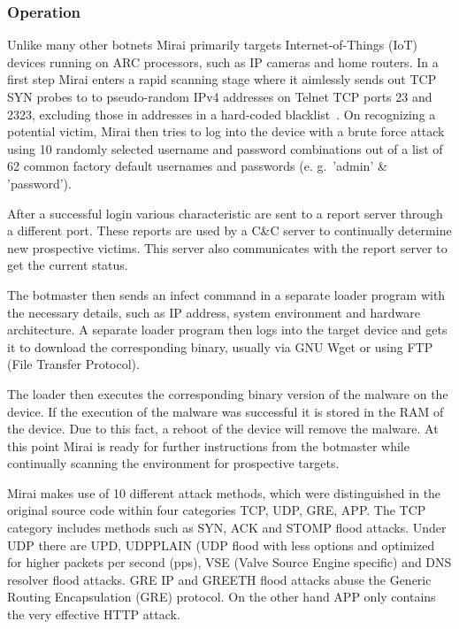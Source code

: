 \subsubsection{Operation}
Unlike many other botnets Mirai primarily targets Internet-of-Things (IoT) devices running on ARC processors, such as IP cameras and home routers.
In a first step Mirai enters a rapid scanning stage where it aimlessly sends out TCP SYN probes to to pseudo-random IPv4 addresses on Telnet TCP ports 23 and 2323, excluding those in addresses in a hard-coded blacklist~\cite{Kolias17}.
On recognizing a potential victim, Mirai then tries to log into the device with a brute force attack using 10 randomly selected username and password combinations out of a list of 62 common factory default usernames and passwords (e. g.\ 'admin' \& 'password').\cite{Antonakakis17}

After a successful login various characteristic are sent to a report server through a different port.
These reports are used by a C\&C server to continually determine new prospective victims.
This server also communicates with the report server to get the current status.\cite{Kolias17}

The botmaster then sends an infect command in a separate loader program with the necessary details, such as IP address, system environment and hardware architecture.
A separate loader program then logs into the target device and gets it to download the corresponding binary, usually via GNU Wget or using FTP (File Transfer Protocol).\cite{Kolias17}

The loader then executes the corresponding binary version of the malware on the device.
If the execution of the malware was successful it is stored in the RAM of the device.
Due to this fact, a reboot of the device will remove the malware.
At this point Mirai is ready for further instructions from the botmaster while continually scanning the environment for prospective targets.\cite{Kolias17}

Mirai makes use of 10 different attack methods, which were distinguished in the original source code within four categories TCP, UDP, GRE, APP. The TCP category includes methods such as SYN, ACK and STOMP flood attacks.
Under UDP there are UPD, UDPPLAIN (UDP flood with less options and optimized for higher packets per second (pps), VSE (Valve Source Engine specific) and DNS resolver flood attacks.
GRE IP and GREETH flood attacks abuse the Generic Routing Encapsulation (GRE) protocol.
On the other hand APP only contains the very effective HTTP attack.\cite{Winward}

